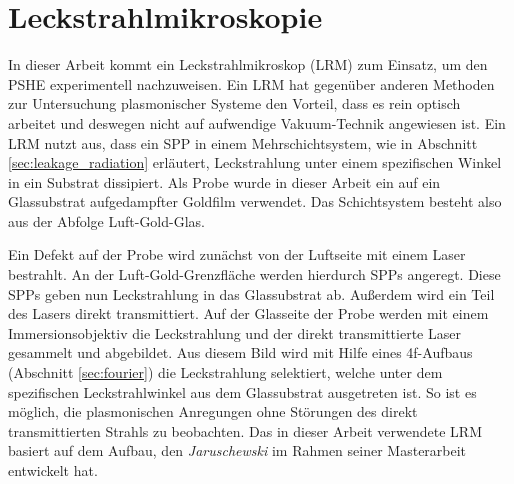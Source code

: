 \documentclass[a4paper, titlepage,  ngerman, fullpage]{book}
\begin{document}
	\section{Leckstrahlmikroskopie}
	In dieser Arbeit kommt ein Leckstrahlmikroskop (LRM) zum Einsatz, um den PSHE experimentell nachzuweisen. Ein LRM hat gegenüber anderen Methoden zur Untersuchung plasmonischer Systeme den Vorteil, dass es rein optisch arbeitet und deswegen nicht auf aufwendige Vakuum-Technik angewiesen ist. Ein LRM nutzt aus, dass ein SPP in einem Mehrschichtsystem, wie in Abschnitt \ref{sec:leakage_radiation} erläutert, Leckstrahlung unter einem spezifischen Winkel in ein Substrat dissipiert. Als Probe wurde in dieser Arbeit ein auf ein Glassubstrat aufgedampfter Goldfilm verwendet. Das Schichtsystem besteht also aus der Abfolge Luft-Gold-Glas.
	
	Ein Defekt auf der Probe wird zunächst von der Luftseite mit einem Laser bestrahlt. An der Luft-Gold-Grenzfläche werden hierdurch SPPs angeregt. Diese SPPs geben nun Leckstrahlung in das Glassubstrat ab.
	Außerdem wird ein Teil des Lasers direkt transmittiert. Auf der Glasseite der Probe werden mit einem Immersionsobjektiv die Leckstrahlung und der direkt transmittierte Laser gesammelt und abgebildet.	
	Aus diesem Bild wird mit Hilfe eines 4f-Aufbaus (Abschnitt \ref{sec:fourier}) die Leckstrahlung selektiert, welche unter dem spezifischen Leckstrahlwinkel aus dem Glassubstrat ausgetreten ist. So ist es möglich, die plasmonischen Anregungen ohne Störungen des direkt transmittierten Strahls zu beobachten. Das in dieser Arbeit verwendete LRM basiert auf dem Aufbau, den \textit{Jaruschewski} im Rahmen seiner Masterarbeit \cite{Jaruschewski.2020} entwickelt hat.
\end{document}
